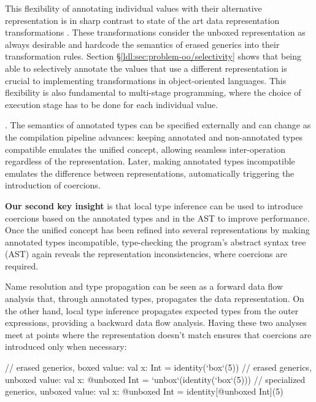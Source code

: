 This flexibility of annotating individual values with their alternative representation is in sharp contrast to state of the art data representation transformations \cite{leroy-unboxed-objects, java-erasure}. These transformations consider the unboxed representation as always desirable and hardcode the semantics of erased generics into their transformation rules. Section \S\ref{ldl:sec:problem-oo/selectivity} shows that being able to selectively annotate the values that use a different representation is crucial to implementing transformations in object-oriented languages. This flexibility is also fundamental to multi-stage programming, where the choice of execution stage has to be done for each individual value.

. The semantics of annotated types can be specified externally and can change as the compilation pipeline advances: keeping annotated and non-annotated types compatible emulates the unified concept, allowing seamless inter-operation regardless of the representation. Later, making annotated types incompatible emulates the difference between representations, automatically triggering the introduction of coercions.

\textbf{Our second key insight} is that local type inference \cite{odersky-colored-local-type-inf, pierce-local-type-inference} can be used to  introduce coercions based on the annotated types and  in the AST to improve performance. Once the unified concept has been refined into several representations by making annotated types incompatible, type-checking the program's abstract syntax tree (AST) again reveals the representation inconsistencies, where coercions are required.

 Name resolution and type propagation can be seen as a forward data flow analysis \cite{kildall-escape-analysis} that, through annotated types, propagates the data representation. On the other hand, local type inference \cite{odersky-colored-local-type-inf, pierce-local-type-inference} propagates expected types from the outer expressions, providing a backward data flow analysis. Having these two analyses meet at points where the representation doesn't match ensures that coercions are introduced only when necessary:

\begin{lstlisting-nobreak}
 // erased generics, boxed value:
 val x: Int = identity(`box`(5))
 // erased generics, unboxed value:
 val x: @unboxed Int = `unbox`(identity(`box`(5)))
 // specialized generics, unboxed value:
 val x: @unboxed Int = identity[@unboxed Int](5)
\end{lstlisting-nobreak}

